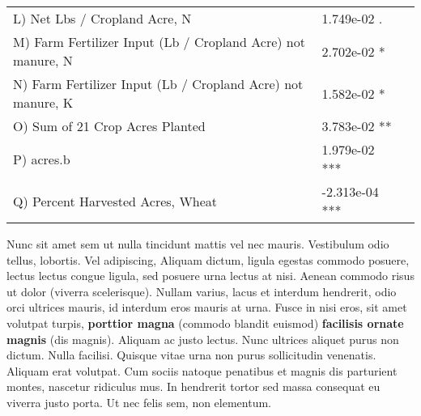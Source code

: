 \documentclass[paperwidth=42in,paperheight=44in]{baposter}
\begin{document}
\begin{poster}
{{\begin{center}
\begin{tabular}{l l l}
L) Net Lbs / Cropland Acre, N \cite{nuGIS} & 1.749e-02  . \\ %
M) Farm Fertilizer Input (Lb / Cropland Acre) not manure, N \cite{nuGIS} & 2.702e-02  * \\ %
N) Farm Fertilizer Input (Lb / Cropland Acre) not manure, K \cite{nuGIS} &  1.582e-02  * \\ %
O) Sum of 21 Crop Acres Planted \cite{nuGIS} & 3.783e-02  ** \\
P) acres.b  & 1.979e-02 *** \\ %
Q) Percent Harvested Acres, Wheat  & -2.313e-04  *** \\ %
\bottomrule
\end{tabular}
\label{coeftable}
\end{center}
}




Nunc sit amet sem ut nulla tincidunt mattis vel nec mauris. Vestibulum odio tellus, lobortis. Vel adipiscing, Aliquam dictum, ligula egestas commodo posuere, lectus lectus congue ligula, sed posuere urna lectus at nisi. Aenean commodo risus ut dolor (viverra scelerisque). Nullam varius, lacus et interdum hendrerit, odio orci ultrices mauris, id interdum eros mauris at urna. Fusce in nisi eros, sit amet volutpat turpis, \textbf{porttior magna} (commodo blandit euismod) \textbf{facilisis ornate magnis} (dis magnis). Aliquam ac justo lectus. Nunc ultrices aliquet purus non dictum. Nulla facilisi. Quisque vitae urna non purus sollicitudin venenatis. Aliquam erat volutpat. Cum sociis natoque penatibus et magnis dis parturient montes, nascetur ridiculus mus. In hendrerit tortor sed massa consequat eu viverra justo porta. Ut nec felis sem, non elementum.
}


\end{poster}
\end{document}

